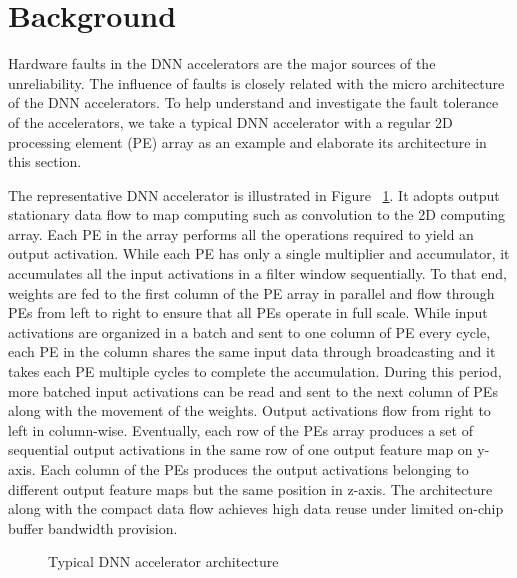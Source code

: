 \section{Background}\label{sec:background}
Hardware faults in the DNN accelerators are the major sources of 
the unreliability. The influence of faults is closely related with 
the micro architecture of the DNN accelerators. To help understand and 
investigate the fault tolerance of the accelerators, we take a typical 
DNN accelerator with a regular 2D processing element (PE) array as an example 
and elaborate its architecture in this section.

The representative DNN accelerator is illustrated in 
Figure ~\ref{fig:npu-arch}. It adopts output stationary data flow 
to map computing such as convolution to the 2D computing array. 
Each PE in the array performs all the operations 
required to yield an output activation. While each PE has only a 
single multiplier and accumulator, it accumulates all the input 
activations in a filter window sequentially. To that end, weights 
are fed to the first column of the PE array in parallel and flow 
through PEs from left to right to ensure that all PEs operate in full 
scale. While input activations are organized in a batch and sent 
to one column of PE every cycle, each PE in the column shares the 
same input data through broadcasting and it takes 
each PE multiple cycles to complete the accumulation. 
During this period, more batched input activations 
can be read and sent to the next column of PEs along with 
the movement of the weights. Output activations flow 
from right to left in column-wise. Eventually, each row of the PEs
array produces a set of sequential output activations in 
the same row of one output feature map on y-axis. 
Each column of the PEs produces the output activations 
belonging to different output feature maps but the 
same position in z-axis. The architecture along with the 
compact data flow achieves high data reuse under limited 
on-chip buffer bandwidth provision. 

\begin{figure}
    \caption{Typical DNN accelerator architecture}
\vspace{-0.5em}
\label{fig:npu-arch}
\end{figure}

